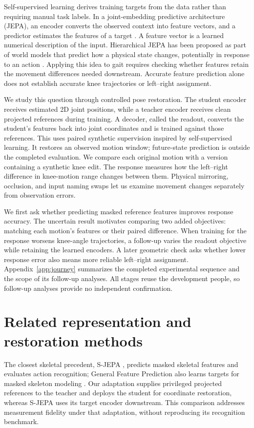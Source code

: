 \documentclass{article}
\begin{document}
Self-supervised learning derives training targets from the data rather than requiring manual task labels. In a joint-embedding predictive architecture (JEPA), an encoder converts the observed context into feature vectors, and a predictor estimates the features of a target \citep{assran2023ijepa,bardes2024vjepa}. A feature vector is a learned numerical description of the input. Hierarchical JEPA has been proposed as part of world models that predict how a physical state changes, potentially in response to an action \citep{lecun2022path}. Applying this idea to gait requires checking whether features retain the movement differences needed downstream. Accurate feature prediction alone does not establish accurate knee trajectories or left--right assignment.

We study this question through controlled pose restoration. The student encoder receives estimated 2D joint positions, while a teacher encoder receives clean projected references during training. A decoder, called the readout, converts the student's features back into joint coordinates and is trained against those references. This uses paired synthetic supervision inspired by self-supervised learning. It restores an observed motion window; future-state prediction is outside the completed evaluation. We compare each original motion with a version containing a synthetic knee edit. The response measures how the left--right difference in knee-motion range changes between them. Physical mirroring, occlusion, and input naming swaps let us examine movement changes separately from observation errors.

We first ask whether predicting masked reference features improves response accuracy. The uncertain result motivates comparing two added objectives: matching each motion's features or their paired difference. When training for the response worsens knee-angle trajectories, a follow-up varies the readout objective while retaining the learned encoders. A later geometric check asks whether lower response error also means more reliable left--right assignment. Appendix~\ref{app:journey} summarizes the completed experimental sequence and the scope of its follow-up analyses. All stages reuse the development people, so follow-up analyses provide no independent confirmation.

\section{Related representation and restoration methods}
The closest skeletal precedent, S-JEPA \citep{abdelfattah2024sjepa}, predicts masked skeletal features and evaluates action recognition; General Feature Prediction also learns targets for masked skeleton modeling \citep{sun2025gfp}. Our adaptation supplies privileged projected references to the teacher and deploys the student for coordinate restoration, whereas S-JEPA uses its target encoder downstream. This comparison addresses measurement fidelity under that adaptation, without reproducing its recognition benchmark.
\end{document}
